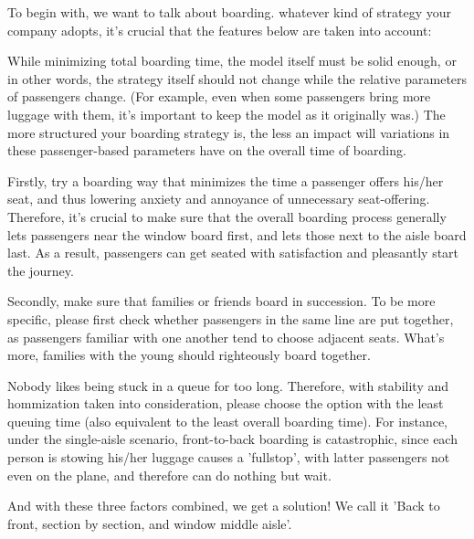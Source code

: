 \documentclass{article}
\theoremstyle{definition}
\theoremstyle{remark}
\numberwithin{equation}{section}
\begin{document}
	To begin with, we want to talk about boarding. whatever kind of strategy your company adopts, it's crucial that the features below are taken into account:

	\begin{itemize}
		
		While minimizing total boarding time, the model itself must be solid enough, or in other words, the strategy itself should not change while the relative parameters of passengers change. (For example, even when some passengers bring more luggage with them, it's important to keep the model as it originally was.) The more structured your boarding strategy is, the less an impact will variations in these passenger-based parameters have on the overall time of boarding.
		
		Firstly, try a boarding way that minimizes the time a passenger offers his/her seat, and thus lowering anxiety and annoyance of unnecessary seat-offering. Therefore, it's crucial to make sure that the overall boarding process generally lets passengers near the window board first, and lets those next to the aisle board last. As a result, passengers can get seated with satisfaction and pleasantly start the journey.

  		Secondly, make sure that families or friends board in succession. To be more specific, please first check whether passengers in the same line are put together, as passengers familiar with one another tend to choose adjacent seats. What's more, families with the young should righteously board together.
		
		Nobody likes being stuck in a queue for too long. Therefore, with stability and hommization taken into consideration, please choose the option with the least queuing time (also equivalent to the least overall boarding time). For instance, under the single-aisle scenario, front-to-back boarding is catastrophic, since each person is stowing his/her luggage causes a 'fullstop', with latter passengers not even on the plane, and therefore can do nothing but wait.

		And with these three factors combined, we get a solution! We call it 'Back to front, section by section, and window middle aisle'.


\end{itemize}
\end{document}
